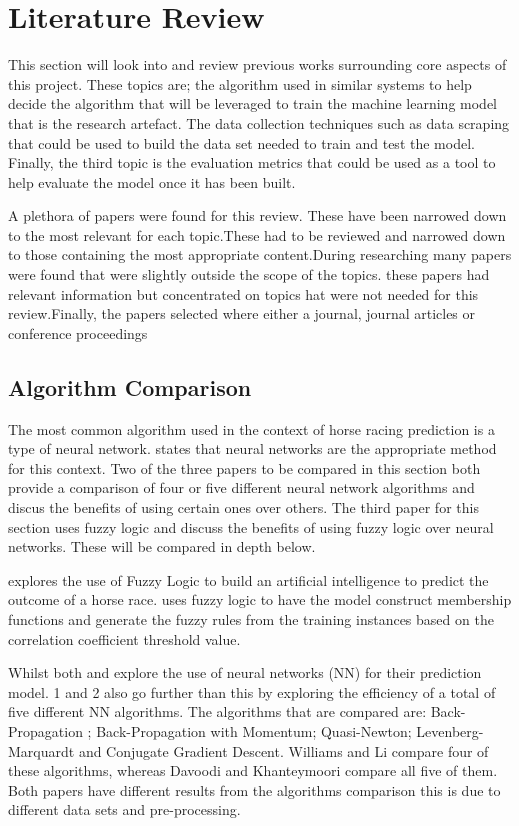 \chapter{Literature Review}\label{ch:Literature Review}

This section will look into and review previous works surrounding core aspects of this project. These topics are; the algorithm used in similar systems to help decide the algorithm that will be leveraged to train the machine learning model that is the research artefact. The data collection techniques such as data scraping that could be used to build the data set needed to train and test the model. Finally, the third topic is the evaluation metrics that could be used as a tool to help evaluate the model once it has been built.


A plethora of papers were found for this review. These have been narrowed down to the most relevant for each topic.These had to be reviewed and narrowed down to those containing the most appropriate content.During researching many papers were found that were slightly outside the scope of the topics. these papers had relevant information but concentrated on topics hat were not needed for this review.Finally, the papers selected where either a journal, journal articles or conference proceedings


\section{Algorithm Comparison}
The most common algorithm used in the context of horse racing prediction is a type of neural network. \cite{Davoodi2010HorseRP} states that neural networks are the appropriate method for this context. Two of the three papers to be compared in this section both provide a comparison of four or five different neural network algorithms and discus the benefits of using certain ones over others. The third paper for this section uses fuzzy logic and discuss the benefits of using fuzzy logic over neural networks. These will be compared in depth below. 

\cite{HRFL}explores the use of Fuzzy Logic  to build an artificial intelligence to predict the outcome of a horse race. \cite{HRFL} uses fuzzy logic to have the model construct membership functions and generate the fuzzy rules from the training instances based on the correlation coefficient threshold value.

Whilst both \cite{Davoodi2010HorseRP} and \cite{HorseJamacia} explore the use of neural networks (NN) for their prediction model. 1 and 2 also go further than this by exploring the efficiency of a total of five different NN algorithms. The algorithms that are compared are: Back-Propagation ; Back-Propagation with Momentum; Quasi-Newton; Levenberg-Marquardt and Conjugate Gradient Descent. Williams and Li compare four of these algorithms, whereas Davoodi and Khanteymoori compare all five of them. Both papers have different results from the algorithms comparison this is due to different data sets and pre-processing.

